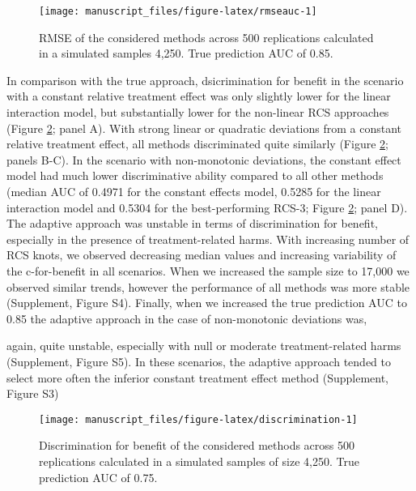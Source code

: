 \documentclass[]{elsarticle} %
\begin{document}
\begin{figure}
\texttt{[image: manuscript\_files/figure-latex/rmseauc-1]} \caption{RMSE of the considered methods across 500 replications calculated in a simulated samples 4,250. True prediction AUC of 0.85.}\label{fig:rmseauc}
\end{figure}

In comparison with the true approach, dsicrimination for benefit in the
scenario with a constant relative treatment effect was only slightly
lower for the linear interaction model, but substantially lower for the
non-linear RCS approaches (Figure \ref{fig:discrimination}; panel A).
With strong linear or quadratic deviations from a constant relative
treatment effect, all methods discriminated quite similarly (Figure
\ref{fig:discrimination}; panels B-C). In the scenario with
non-monotonic deviations, the constant effect model had much lower
discriminative ability compared to all other methods (median AUC of
0.4971 for the constant effects model, 0.5285 for the linear interaction
model and 0.5304 for the best-performing RCS-3; Figure
\ref{fig:discrimination}; panel D). The adaptive approach was unstable
in terms of discrimination for benefit, especially in the presence of
treatment-related harms. With increasing number of RCS knots, we
observed decreasing median values and increasing variability of the
c-for-benefit in all scenarios. When we increased the sample size to
17,000 we observed similar trends, however the performance of all
methods was more stable (Supplement, Figure S4). Finally, when we
increased the true prediction AUC to 0.85 the adaptive approach in the
case of non-monotonic deviations was,

again, quite unstable, especially with null or moderate
treatment-related harms (Supplement, Figure S5). In these scenarios, the
adaptive approach tended to select more often the inferior constant
treatment effect method (Supplement, Figure S3)

\begin{figure}
\texttt{[image: manuscript\_files/figure-latex/discrimination-1]} \caption{Discrimination for benefit of the considered methods across 500 replications calculated in a simulated samples of size 4,250. True prediction AUC of 0.75.}\label{fig:discrimination}
\end{figure}
\end{document}
